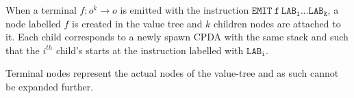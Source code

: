 \documentclass{article}
\begin{document}
When a terminal $f:o^k\rightarrow o$ is emitted with the instruction
$\mathtt{EMIT\ f\ LAB_1 \ldots LAB_k}$, a node labelled $f$ is created in the value tree and $k$ children nodes are attached to it. Each child corresponds to a newly spawn CPDA with the same stack
and such that the $i^{th}$ child's starts at the instruction labelled with $\mathtt{LAB_i}$.

Terminal nodes represent the actual nodes of the value-tree and as such cannot be expanded further.



\end{document}
